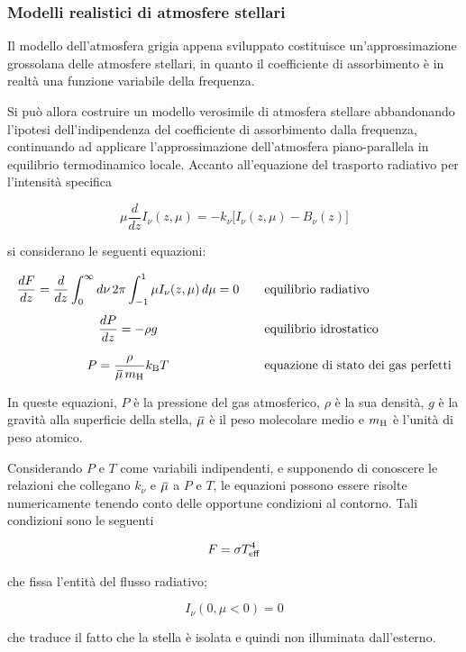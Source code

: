 \subsubsection{Modelli realistici di atmosfere stellari}

Il modello dell'atmosfera grigia appena sviluppato costituisce un'approssimazione grossolana delle atmosfere stellari, in quanto il coefficiente di assorbimento è in realtà una funzione variabile della frequenza.

Si può allora costruire un modello verosimile di atmosfera stellare abbandonando l'ipotesi dell'indipendenza del coefficiente di assorbimento dalla frequenza, continuando ad applicare l'approssimazione dell'atmosfera piano-parallela in equilibrio termodinamico locale. Accanto all'equazione
del trasporto radiativo per l'intensità specifica

$$\mu \frac{d}{dz} I_{\nu}(z,\mu)=-k_{\nu} \big[ I_{\nu} (z,\mu) - B_{\nu}(z) \big]$$

si considerano le seguenti equazioni:

$$\begin{array}{ccl}
    \displaystyle \frac{dF}{dz}=\frac{d}{dz} \int_{0}^{\infty} d\nu \, 2 \pi \int_{-1}^{1} \mu I_{\nu}(z,\mu) \, d\mu=0 && \text{equilibrio radiativo}\\[0.5cm]
    \displaystyle \frac{dP}{dz}=-\rho g && \text{equilibrio idrostatico}\\[0.5cm]
    \displaystyle P=\frac{\rho}{{}\mkern3mu\overline{\mkern-3mu\mu} \, m_{\rm H}} k_{\rm B} T && \text{equazione di stato dei gas perfetti}
\end{array}$$

In queste equazioni, $P$ è la pressione del gas atmosferico, $\rho$ è la sua densità, $g$ è la gravità alla superficie della stella, ${}\mkern3mu\overline{\mkern-3mu\mu}$ è il peso molecolare medio e $m_{\rm H}$ è l'unità di peso atomico.

Considerando $P$ e $T$ come variabili indipendenti, e supponendo di conoscere le relazioni che collegano $k_{\nu}$ e ${}\mkern3mu\overline{\mkern-3mu\mu}$ a $P$ e $T$, le equazioni possono essere risolte numericamente tenendo conto delle opportune
condizioni al contorno. Tali condizioni sono le seguenti

$$F=\sigma T^4_{\rm eff}$$

che fissa l'entità del flusso radiativo;

$$I_{\nu}(0,\mu<0)=0$$

che traduce il fatto che la stella è isolata e quindi non illuminata dall'esterno.

